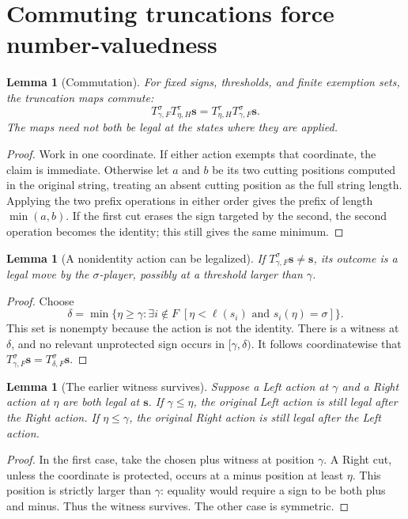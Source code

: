 \documentclass[11pt,letterpaper]{article}
\newtheorem{lemma}[theorem]{Lemma}
\theoremstyle{definition}
\theoremstyle{remark}
\newcommand{\bs}{\boldsymbol{s}}
\newcommand{\len}{\ell}
\begin{document}
\section{Commuting truncations force number-valuedness}\label{sec:number}

\begin{lemma}[Commutation]\label{lem:commute}
For fixed signs, thresholds, and finite exemption sets, the truncation maps
commute:
\begin{equation}\label{eq:commutation}
 T^\sigma_{\gamma,F}T^\tau_{\eta,H}\bs
   =T^\tau_{\eta,H}T^\sigma_{\gamma,F}\bs.
\end{equation}
The maps need not both be legal at the states where they are applied.
\end{lemma}
\begin{proof}
Work in one coordinate. If either action exempts that coordinate, the claim is
immediate. Otherwise let $a$ and $b$ be its two cutting positions computed in
the original string, treating an absent cutting position as the full string
length. Applying the two prefix operations in either order gives the prefix of
length $\min(a,b)$. If the first cut erases the sign targeted by the second,
the second operation becomes the identity; this still gives the same minimum.
\end{proof}

\begin{lemma}[A nonidentity action can be legalized]\label{lem:legalize}
If $T^\sigma_{\gamma,F}\bs\neq\bs$, its outcome is a legal move by the
$\sigma$-player, possibly at a threshold larger than $\gamma$.
\end{lemma}
\begin{proof}
Choose
\[
 \delta=\min\{\eta\geq\gamma:\exists i\notin F\;
                [\eta<\len(s_i)\text{ and }s_i(\eta)=\sigma]\}.
\]
This set is nonempty because the action is not the identity. There is a witness
at $\delta$, and no relevant unprotected sign occurs in $[\gamma,\delta)$.
It follows coordinatewise that
$T^\sigma_{\gamma,F}\bs=T^\sigma_{\delta,F}\bs$.
\end{proof}

\begin{lemma}[The earlier witness survives]\label{lem:survive}
Suppose a Left action at $\gamma$ and a Right action at $\eta$ are both legal
at $\bs$. If $\gamma\leq\eta$, the original Left action is still legal after
the Right action. If $\eta\leq\gamma$, the original Right action is still legal
after the Left action.
\end{lemma}
\begin{proof}
In the first case, take the chosen plus witness at position $\gamma$. A Right
cut, unless the coordinate is protected, occurs at a minus position at least
$\eta$. This position is strictly larger than $\gamma$: equality would require
a sign to be both plus and minus. Thus the witness survives. The other case is
symmetric.
\end{proof}
\end{document}
